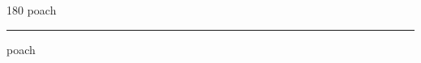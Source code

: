 
\begin{frame}
\begin{center}
\begin{turn}{180}
{\fontsize{2.5cm}{1em}\selectfont poach}
\end{turn}
\vspace{1em}\par  
\hrule
\vspace{1em}\par  
{\fontsize{2.5cm}{1em}\selectfont poach}
\end{center}
\end{frame}
